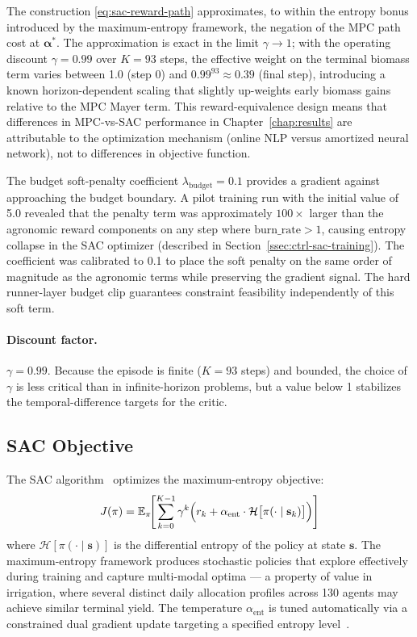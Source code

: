 The construction \eqref{eq:sac-reward-path} approximates, to within
the entropy bonus introduced by the maximum-entropy framework, the negation
of the MPC path cost at $\boldsymbol{\alpha}^*$. The approximation is exact
in the limit $\gamma \to 1$; with the operating discount $\gamma = 0.99$
over $K = 93$ steps, the effective weight on the terminal biomass term
varies between 1.0 (step 0) and $0.99^{93} \approx 0.39$ (final step),
introducing a known horizon-dependent scaling that slightly up-weights
early biomass gains relative to the MPC Mayer term. This
reward-equivalence design means that differences in MPC-vs-SAC performance
in Chapter~\ref{chap:results} are attributable to the optimization mechanism
(online NLP versus amortized neural network), not to differences in objective
function.

The budget soft-penalty coefficient $\lambda_{\mathrm{budget}} = 0.1$
provides a gradient against approaching the budget boundary. A pilot
training run with the initial value of 5.0 revealed that the penalty term
was approximately $100\times$ larger than the agronomic reward components on
any step where $\mathrm{burn\_rate} > 1$, causing entropy collapse in the
SAC optimizer (described in Section~\ref{ssec:ctrl-sac-training}). The
coefficient was calibrated to 0.1 to place the soft penalty on the same
order of magnitude as the agronomic terms while preserving the gradient
signal. The hard runner-layer budget clip guarantees constraint feasibility
independently of this soft term.

\paragraph{Discount factor.}
$\gamma = 0.99$. Because the episode is finite ($K = 93$ steps) and bounded,
the choice of $\gamma$ is less critical than in infinite-horizon problems,
but a value below 1 stabilizes the temporal-difference targets for the
critic.

\subsection{SAC Objective}
\label{ssec:ctrl-sac-objective}

The SAC algorithm~\cite{haarnoja2018sac,haarnoja2019sac} optimizes the
maximum-entropy objective:
\begin{equation}
J(\pi) = \mathbb{E}_{\pi}\!\Biggl[
  \sum_{k=0}^{K-1} \gamma^k \Bigl(
    r_k + \alpha_{\mathrm{ent}} \cdot
    \mathcal{H}\bigl[\pi(\cdot\mid\mathbf{s}_k)\bigr]
  \Bigr)
\Biggr]
\label{eq:sac-objective}
\end{equation}
where $\mathcal{H}[\pi(\cdot\mid\mathbf{s})]$ is the differential entropy
of the policy at state $\mathbf{s}$. The maximum-entropy framework produces
stochastic policies that explore effectively during training and capture
multi-modal optima — a property of value in irrigation, where several
distinct daily allocation profiles across 130 agents may achieve similar
terminal yield. The temperature $\alpha_{\mathrm{ent}}$ is tuned
automatically via a constrained dual gradient update targeting a specified
entropy level~\cite{haarnoja2019sac}.

